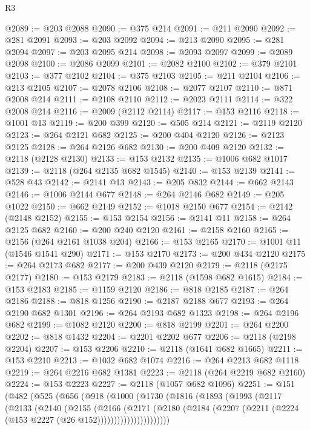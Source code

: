 \begin{lexlean}{R3}
\begin{coremodule}
@2089 := @203 @2088
@2090 := @375 @214
@2091 := @211 @2090
@2092 := @281 @2091
@2093 := @203 @2092
@2094 := @213 @2090
@2095 := @281 @2094
@2097 := @203 @2095 @214
@2098 := @2093 @2097
@2099 := @2089 @2098
@2100 := @2086 @2099
@2101 := @2082 @2100
@2102 := @379 @2101
@2103 := @377 @2102
@2104 := @375 @2103
@2105 := @211 @2104
@2106 := @213 @2105
@2107 := @2078 @2106
@2108 := @2077 @2107
@2110 := @871 @2008 @214
@2111 := @2108 @2110
@2112 := @2023 @2111
@2114 := @322 @2008 @214
@2116 := @2009 (@2112 @2114)
@2117 := @153 @2116
@2118 := @1001 @13
@2119 := @200 @399
@2120 := @505 @214
@2121 := @2119 @2120
@2123 := @264 @2121 @682
@2125 := @200 @404 @2120
@2126 := @2123 @2125
@2128 := @264 @2126 @682
@2130 := @200 @409 @2120
@2132 := @2118 (@2128 @2130)
@2133 := @153 @2132
@2135 := @1006 @682 @1017
@2139 := @2118 (@264 @2135 @682 @1545)
@2140 := @153 @2139
@2141 := @528 @43
@2142 := @2141 @13
@2143 := @205 @832
@2144 := @662 @2143
@2146 := @1006 @2144 @677
@2148 := @264 @2146 @682
@2149 := @205 @1022
@2150 := @662 @2149
@2152 := @1018 @2150 @677
@2154 := @2142 (@2148 @2152)
@2155 := @153 @2154
@2156 := @2141 @11
@2158 := @264 @2125 @682
@2160 := @200 @240 @2120
@2161 := @2158 @2160
@2165 := @2156 (@264 @2161 @1038 @204)
@2166 := @153 @2165
@2170 := @1001 @11 (@1546 @1541 @290)
@2171 := @153 @2170
@2173 := @200 @434 @2120
@2175 := @264 @2173 @682
@2177 := @200 @439 @2120
@2179 := @2118 (@2175 @2177)
@2180 := @153 @2179
@2183 := @2118 (@1598 @682 @1615)
@2184 := @153 @2183
@2185 := @1159 @2120
@2186 := @818 @2185
@2187 := @264 @2186
@2188 := @818 @1256
@2190 := @2187 @2188 @677
@2193 := @264 @2190 @682 @1301
@2196 := @264 @2193 @682 @1323
@2198 := @264 @2196 @682
@2199 := @1082 @2120
@2200 := @818 @2199
@2201 := @264 @2200
@2202 := @818 @1432
@2204 := @2201 @2202 @677
@2206 := @2118 (@2198 @2204)
@2207 := @153 @2206
@2210 := @2118 (@1641 @682 @1665)
@2211 := @153 @2210
@2213 := @1032 @682 @1074
@2216 := @264 @2213 @682 @1118
@2219 := @264 @2216 @682 @1381
@2223 := @2118 (@264 @2219 @682 @2160)
@2224 := @153 @2223
@2227 := @2118 (@1057 @682 @1096)
@2251 := @151
    (@482
      (@525
        (@656
          (@918
            (@1000
              (@1730
                (@1816
                  (@1893
                    (@1993
                      (@2117
                        (@2133
                          (@2140
                            (@2155
                              (@2166
                                (@2171
                                  (@2180
                                    (@2184
                                      (@2207
                                        (@2211 (@2224 (@153 @2227 (@26 @152))))))))))))))))))))))

\end{coremodule}
\end{lexlean}
